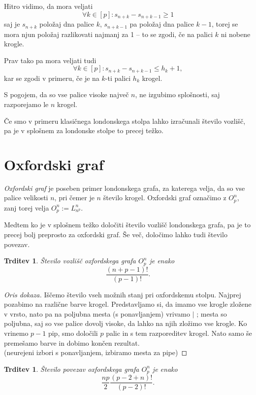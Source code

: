 \documentclass[11pt,a4paper]{article}
\theoremstyle{definition} %
\theoremstyle{plain} %
\newtheorem{trditev}[definicija]{Trditev}
\begin{document}
Hitro vidimo, da mora veljati 
\[\forall k \in [p]\colon s_{n+k} - s_{n+k-1} \geq 1 \]
saj je $s_{n+k}$ položaj dna palice $k$, $s_{n+k-1}$ pa položaj dna palice $k-1$, torej se mora njun položaj razlikovati najmanj za 1 -- to se zgodi, če na palici $k$ ni nobene krogle.

Prav tako pa mora veljati tudi 
\[\forall k \in [p]\colon s_{n+k} - s_{n+k-1} \leq h_k + 1,\]
kar se zgodi v primeru, če je na $k$-ti palici $h_k$ krogel.

S pogojem, da so vse palice visoke največ $n$, ne izgubimo splošnosti, saj razporejamo le $n$ krogel.

Če smo v primeru klasičnega londonskega stolpa lahko izračunali število vozlišč, pa je v splošnem za londonske stolpe to precej težko. 

\section{Oxfordski graf}

\emph{Oxfordski graf} je poseben primer londonskega grafa, za katerega velja, da so vse palice velikosti $n$, pri čemer je $n$ število krogel. Oxfordski graf označimo z $O^n_p$, zanj torej velja $O^n_p := L^n_{n^p}$.

Medtem ko je v splošnem težko določiti število vozlišč londonskega grafa, pa je to precej bolj preprosto za oxfordski graf. Še več, določimo lahko tudi število povezav.

\begin{trditev}
    Število vozlišč oxfordskega grafa $O^n_p$ je enako \[\frac{(n+p-1)!}{(p-1)!}.\]
\end{trditev}

\begin{proof}[Oris dokaza]
    Iščemo število vseh možnih stanj pri oxfordskemu stolpu. Najprej pozabimo na različne barve krogel. Predstavljamo si, da imamo vse krogle zložene v vrsto, nato pa na poljubna mesta (s ponavljanjem) vrivamo $|$ ; mesta so poljubna, saj so vse palice dovolj visoke, da lahko na njih zložimo vse krogle. Ko vrinemo $p-1$ pip, smo določili $p$ palic in s tem razporeditev krogel. Nato samo še premešamo barve in dobimo končen rezultat.\\
    (neurejeni izbori s ponavljanjem, izbiramo mesta za pipe)
\end{proof}

\begin{trditev}
    Število povezav oxfordskega grafa $O^n_p$ je enako
    \[ \frac{np}{2} \frac{(p-2+n)!}{(p-2)!} .\]
\end{trditev}
\end{document}
